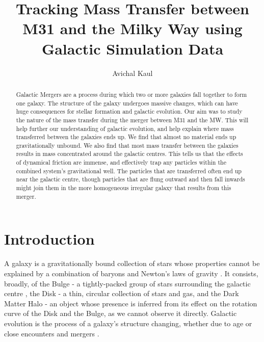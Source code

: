 \documentclass[linenumbers, ]{aastex631}
\begin{document}
\title{Tracking Mass Transfer between M31 and the Milky Way using Galactic Simulation Data}



\author{Avichal Kaul}

\begin{abstract}
Galactic Mergers are a process during which two or more galaxies fall together to form one galaxy. The structure of the galaxy undergoes massive changes, which can have huge consequences for stellar formation and galactic evolution. Our aim was to study the nature of the mass transfer during the merger between M31 and the MW. This will help further our understanding of galactic evolution, and help explain where mass transferred between the galaxies ends up. We find that almost no material ends up gravitationally unbound. We also find that most mass transfer between the galaxies results in mass concentrated around the galactic centres. This tells us that the effects of dynamical friction are immense, and effectively trap any particles within the combined system's gravitational well. The particles that are transferred often end up near the galactic centre, though particles that are flung outward and then fall inwards might join them in the more homogeneous irregular galaxy that results from this merger.
\end{abstract}


\section{Introduction}

A galaxy is a gravitationally bound collection of stars whose properties
cannot be explained by a combination of baryons and Newton’s laws of gravity \citep{Willman_Strader_2012}. It consists, broadly, of the Bulge - a tightly-packed group of stars surrounding the galactic centre \citep{Minniti_2007}, the Disk - a thin, circular collection of stars and gas, and the Dark Matter Halo - an object whose presence is inferred from its effect on the rotation curve of the Disk and the Bulge, as we cannot observe it directly. Galactic evolution is the process of a galaxy's structure changing, whether due to age or close encounters and mergers \citep{doi:10.1146/annurev-astro-081913-040037}.
\end{document}
